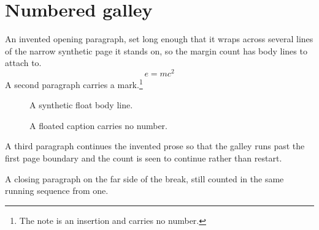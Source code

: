 \documentclass{article}
\begin{document}
\section{Numbered galley}
An invented opening paragraph, set long enough that it wraps across
several lines of the narrow synthetic page it stands on, so the margin
count has body lines to attach to.
\begin{equation*}
e = m c^2
\end{equation*}
A second paragraph carries a mark.\footnote{The note is an insertion
and carries no number.}
\begin{figure}
A synthetic float body line.
\caption{A floated caption carries no number.}
\end{figure}
A third paragraph continues the invented prose so that the galley runs
past the first page boundary and the count is seen to continue rather
than restart.

A closing paragraph on the far side of the break, still counted in the
same running sequence from one.
\end{document}
